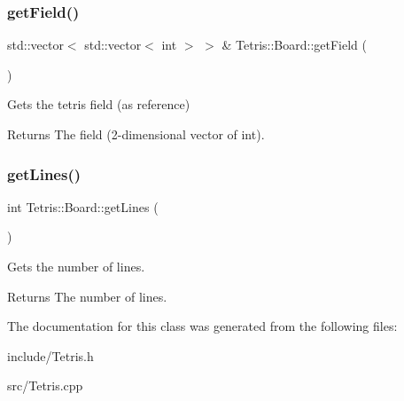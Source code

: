 \subsubsection{\texorpdfstring{get\+Field()}{getField()}}
{\footnotesize\ttfamily std\+::vector$<$ std\+::vector$<$ int $>$ $>$ \& Tetris\+::\+Board\+::get\+Field (\begin{DoxyParamCaption}{ }\end{DoxyParamCaption})}



Gets the tetris field (as reference) 

\begin{DoxyReturn}{Returns}
The field (2-\/dimensional vector of int). 
\end{DoxyReturn}
\mbox{\label{classTetris_1_1Board_a53a614c61a25dfb508ccb45f235bb3b5}} 
\subsubsection{\texorpdfstring{get\+Lines()}{getLines()}}
{\footnotesize\ttfamily int Tetris\+::\+Board\+::get\+Lines (\begin{DoxyParamCaption}{ }\end{DoxyParamCaption})}



Gets the number of lines. 

\begin{DoxyReturn}{Returns}
The number of lines. 
\end{DoxyReturn}


The documentation for this class was generated from the following files\+:\begin{DoxyCompactItemize}
\item 
include/Tetris.\+h\item 
src/Tetris.\+cpp\end{DoxyCompactItemize}

